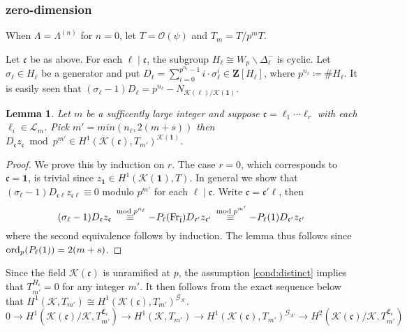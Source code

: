 \documentclass[leqno]{amsart}
\newtheorem{lem}[thm]{Lemma}
\theoremstyle{definition}
\theoremstyle{remark}
\newcommand{\id}{\mathbf{1}}
\newcommand{\oo}{\mathcal{O}}
\newcommand{\Z}{{\mathbf{Z}}}
\DeclareMathOperator{\Gal}{\mathcal{G}}
\newcommand{\Fr}{\textnormal{Fr}} %
\newcommand{\fc}{\mathfrak{c}}
\newcommand{\fl}{\mathfrak{l}}
\newcommand{\K}{{\mathcal{K}}} %
\newcommand{\flw}{\bar{\fl}}
\newcommand{\rp}[1]{\mathfrak{C}_{#1}} %
\newcommand{\rs}[1]{H_{#1}} %
\newcommand{\rk}[1]{\K({#1})} %
\newcommand{\ord}{\textnormal{ord}} %
\begin{document}
\subsubsection{zero-dimension}

When $\Lambda=\Lambda^{(n)}$ for $n=0$,
let  $T=\oo(\psi)$ and  $T_m=T/p^mT$.

Let $\fc$ be as above.
For each $\ell\mid\fc$,
the subgroup  $\rs{\ell}\cong W_p\backslash \Delta_\ell^-$
is cyclic.
Let  $\sigma_\ell\in \rs{\ell}$ be a generator
and put 
$D_\ell=\sum_{i=0}^{p^{n_\ell}-1}i\cdot \sigma_\ell^i
\in \Z[\rs{\ell}]$,
where $p^{n_\ell}\coloneqq \#\rs{\ell}$.
It is easily seen that 
$(\sigma_\ell-1)D_\ell=p^{n_\ell}-N_{\rk{\ell}/\rk{\id}}$.

\begin{lem}
Let $m$ be a sufficently large integer and
suppose $\fc=\ell_1\cdots\ell_r$
with each $\ell_i\in\mathcal{L}_m$.
Pick $m'=min(n_\ell, 2(m+s))$ then
$D_{\fc}z_{\fc}\bmod p^{m'}\in 
H^1(\rk{\fc},T_{m'})^{\rk{\id}}$.
\end{lem}
\begin{proof}
We prove this by induction on $r$.
The case $r=0$, which corresponds to 
$\fc=\id$, is trivial
since $z_{\id}\in H^1(\rk{\id},T)$.
In general
we show that 
$(\sigma_\ell-1)D_{\fc\ell}z_{\fc\ell}\equiv 0$
modulo  $p^{m'}$ for each $\ell\mid \fc$.
Write $\fc=\fc'\ell$, then
\[
	 (\sigma_\ell-1)D_{\fc}z_{\fc}
	 \overset{\bmod  p^{n_\ell}}{\equiv}
	 -P_\ell(\Fr_{\flw})D_{\fc'}z_{\fc'}
	 \overset{\bmod  p^{m'}}{\equiv}
	 -P_\ell(1)D_{\fc'}z_{\fc'}
\]
where the second equivalence follows by induction.
The lemma thus follows
since $\ord_p(P_\ell(1))=2(m+s)$.
\end{proof}
Since the field $\rk{\fc}$
is unramified at  $p$,
the assumption \eqref{cond:distinct}
implies that $T_{m'}^{\rs{\fc}}=0$
for any integer $m'$. 
It then follows from the exact sequence below
that $H^1(\K, T_{m'})\cong 
H^1(\rk{\fc}, T_{m'})^{\Gal_\K}$.
\[
	0\to H^1(\rk{\fc}/\K, T_{m'}^{\rp{\fc}})\to
	H^1(\K, T_{m'})\to
	H^1(\rk{\fc}, T_{m'})^{\Gal_\K}\to
	H^2(\rk{\fc}/\K, T_{m'}^{\rp{\fc}})
\]
\end{document}
